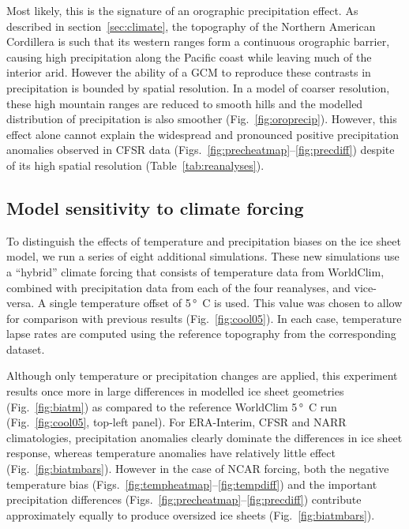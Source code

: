 Most likely, this is the signature of an orographic precipitation effect. As described in section~\ref{sec:climate}, the topography of the Northern American Cordillera is such that its western ranges form a continuous orographic barrier, causing high precipitation along the Pacific coast while leaving much of the interior arid. However the ability of a GCM to reproduce these contrasts in precipitation is bounded by spatial resolution. In a model of coarser resolution, these high mountain ranges are reduced to smooth hills and the modelled distribution of precipitation is also smoother (Fig.~\ref{fig:oroprecip}). However, this effect alone cannot explain the widespread and pronounced positive precipitation anomalies observed in CFSR data (Figs.~\ref{fig:precheatmap}--\ref{fig:precdiff}) despite of its high spatial resolution (Table~\ref{tab:reanalyses}).

\subsection{Model sensitivity to climate forcing}

To distinguish the effects of temperature and precipitation biases on the ice sheet model, we run a series of eight additional simulations. These new simulations use a “hybrid” climate forcing that consists of temperature data from WorldClim, combined with precipitation data from each of the four reanalyses, and vice-versa. A single temperature offset of 5\,\unit{\degree C} is used. This value was chosen to allow for comparison with previous results (Fig.~\ref{fig:cool05}). In each case, temperature lapse rates are computed using the reference topography from the corresponding dataset.

Although only temperature or precipitation changes are applied, this experiment results once more in large differences in modelled ice sheet geometries (Fig.~\ref{fig:biatm}) as compared to the reference WorldClim 5\,\unit{\degree C} run (Fig.~\ref{fig:cool05}, top-left panel). For ERA-Interim, CFSR and NARR climatologies, precipitation anomalies clearly dominate the differences in ice sheet response, whereas temperature anomalies have relatively little effect (Fig.~\ref{fig:biatmbars}). However in the case of NCAR forcing, both the negative temperature bias (Figs.~\ref{fig:tempheatmap}--\ref{fig:tempdiff}) and the important precipitation differences (Figs.~\ref{fig:precheatmap}--\ref{fig:precdiff}) contribute approximately equally to produce oversized ice sheets (Fig.~\ref{fig:biatmbars}).

